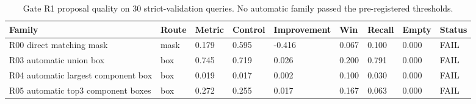\begin{table}[t]
\centering
\small
\caption{Gate R1 proposal quality on 30 strict-validation queries. No automatic family passed the pre-registered thresholds.}
\label{tab:r1_quality}
\begin{tabular}{lllllllll}
\hline
Family & Route & Metric & Control & Improvement & Win & Recall & Empty & Status \\
\hline
R00 direct matching mask & mask & 0.179 & 0.595 & -0.416 & 0.067 & 0.100 & 0.000 & FAIL \\
R03 automatic union box & box & 0.745 & 0.719 & 0.026 & 0.200 & 0.791 & 0.000 & FAIL \\
R04 automatic largest component box & box & 0.019 & 0.017 & 0.002 & 0.100 & 0.030 & 0.000 & FAIL \\
R05 automatic top3 component boxes & box & 0.272 & 0.255 & 0.017 & 0.167 & 0.063 & 0.000 & FAIL \\
\hline
\end{tabular}
\end{table}
